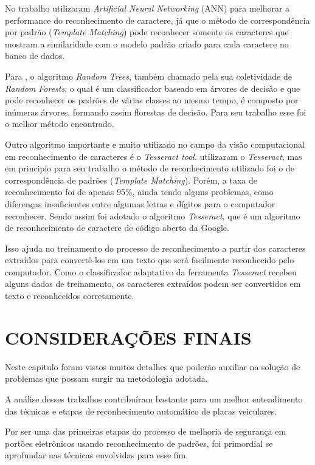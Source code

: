 No trabalho  utilizaram \textit{Artificial Neural Networking} (ANN) para melhorar a performance do reconhecimento de caractere, já que o método de correspondência por padrão (\textit{Template Matching}) pode reconhecer somente os caracteres que mostram a similaridade com o modelo padrão criado para cada caractere no banco de dados.

Para , o algoritmo \textit{Random Trees}, também chamado pela sua coletividade de \textit{Random Forests}, o qual é um classificador baseado em árvores de decisão e que pode reconhecer os padrões de várias classes ao mesmo tempo, é composto por inúmeras árvores, formando assim florestas de decisão. Para seu trabalho esse foi o melhor método encontrado.

Outro algoritmo importante e muito utilizado no campo da visão computacional em reconhecimento de caracteres é o \textit{Tesseract tool}. \cite{jia2016} utilizaram o \textit{Tesseract}, mas em principio para seu trabalho o método de reconhecimento utilizado foi o de correspondência de padrões (\textit{Template Matching}). Porém, a taxa de reconhecimento foi de apenas 95\%, ainda tendo alguns problemas, como diferenças insuficientes entre algumas letras e dígitos para o computador reconhecer. Sendo assim foi adotado o algoritmo \textit{Tesseract}, que é um algoritmo de reconhecimento de caractere de código aberto da Google.

Isso ajuda no treinamento do processo de reconhecimento a partir dos caracteres extraídos para convertê-los em um texto que será facilmente reconhecido pelo computador. Como o classificador adaptativo da ferramenta \textit{Tesseract} recebeu alguns dados de treinamento, os caracteres extraídos podem ser convertidos em texto e reconhecidos corretamente.

\section{\uppercase{Considerações Finais}}

Neste capitulo foram vistos muitos detalhes que poderão auxiliar na solução de problemas que possam surgir na metodologia adotada.

A análise desses trabalhos contribuíram bastante para um melhor entendimento das técnicas e etapas de reconhecimento automático de placas veiculares.

Por ser uma das primeiras etapas do processo de melhoria de segurança em portões eletrônicos usando reconhecimento de padrões, foi primordial se aprofundar nas técnicas envolvidas para esse fim.
